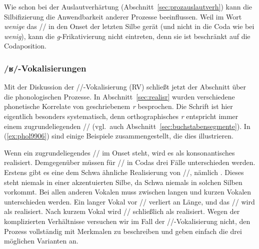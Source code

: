 \begin{exe}
  \ex\label{ex:phol9990}
  \begin{xlist}
  \end{xlist}
\end{exe}

Wie schon bei der Auslautverhärtung (Abschnitt~\ref{sec:prozauslautverh}) kann die Silbifizierung die Anwendbarkeit anderer Prozesse beeinflussen.
Weil im Wort \textit{wenige} das // in den Onset der letzten Silbe gerät (und nicht in die Coda wie bei \textit{wenig}), kann die \textit{g}-Frikativierung nicht eintreten, denn sie ist beschränkt auf die Codaposition.

\subsubsection{/ʁ/-Vokalisierungen}

\label{sec:prozrvok}

Mit der Diskussion der //-Vo\-ka\-li\-sie\-rung (RV) schließt jetzt der Abschnitt über die phonologischen Prozesse.
In Abschnitt~\ref{sec:realisr} wurden verschiedene phonetische Korrelate von geschriebenem \textit{r} besprochen.
Die Schrift ist hier eigentlich besonders systematisch, denn orthographisches \textit{r} entspricht immer einem zugrundeliegenden // (vgl.\ auch Abschnitt~\ref{sec:buchstabensegmente}).
In (\ref{ex:phol9906}) sind einige Beispiele zusammengestellt, die dies illustrieren.

\begin{exe}
  \ex\label{ex:phol9906}
  \begin{xlist}
  \end{xlist}
\end{exe}

Wenn ein zugrundeliegendes // im Onset steht, wird es als konsonantisches \textipa{[K]} realisiert.
Demgegenüber müssen für // in Codas drei Fälle unterschieden werden.
Erstens gibt es eine dem Schwa ähnliche Realisierung von //, nämlich \textipa{[5]}.
Dieses steht niemals in einer akzentuierten Silbe, da Schwa niemals in solchen Silben vorkommt.
Bei allen anderen Vokalen muss zwischen langen und kurzen Vokalen unterschieden werden.
Ein langer Vokal vor // verliert an Länge, und das // wird als \textipa{[5]} realisiert.
Nach kurzem Vokal wird // schließlich als \textipa{[@]} realisiert.
Wegen der komplizierten Verhältnisse versuchen wir im Fall der //-Vokalisierung nicht, den Prozess vollständig mit Merkmalen zu beschreiben und geben einfach die drei möglichen Varianten an.

